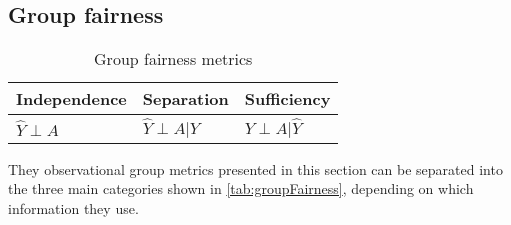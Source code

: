 \subsection{Group fairness}
\label{sec:groupFairnessChapter}
\begin{table}
    \centering
    \begin{tabular}{lll}
        \toprule
        Independence & Separation & {Sufficiency} \\
        \midrule
        $\hat{Y} \perp A$ & $\hat{Y} \perp A | Y$ & {$Y \perp A | \hat{Y}$}\\
        \bottomrule
    \end{tabular}
    \caption{Group fairness metrics}
    \label{tab:groupFairness}
\end{table}

They observational group metrics presented in this section can be separated into the three main categories shown in \autoref{tab:groupFairness}, depending on which information they use.

